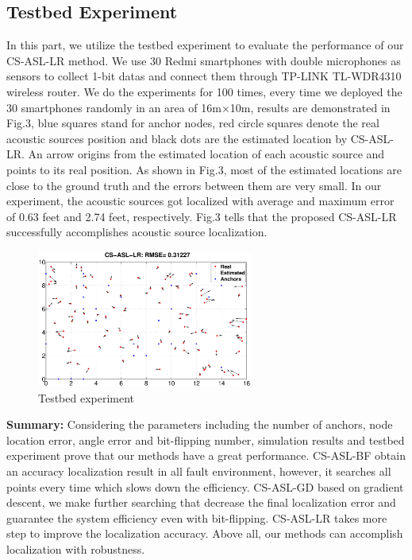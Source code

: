 \subsection{Testbed Experiment}
In this part, we utilize the testbed experiment to evaluate the performance of our CS-ASL-LR method. We use 30 Redmi smartphones with double microphones as sensors to collect 1-bit datas and connect them through TP-LINK TL-WDR4310 wireless router. We do the experiments for 100 times, every time we deployed the 30 smartphones randomly in an area of 16m$\times$10m, results are demonstrated in Fig.3, blue squares stand for anchor nodes, red circle squares denote the real acoustic sources position and black dots are the estimated location by CS-ASL-LR. An arrow origins from the estimated location of each acoustic source and points to its real position. As shown in Fig.3, most of the estimated locations are close to the ground truth and the errors between them are very small. In our experiment, the acoustic sources got localized with average and maximum error of 0.63 feet and 2.74 feet, respectively. Fig.3 tells that the proposed CS-ASL-LR successfully accomplishes acoustic source localization.

\begin{figure}[htb]
	\centering
	\includegraphics[height=4.5cm]{image/lab.eps} 
	\caption{Testbed experiment}
	\label{overview}
\end{figure} 

 \textbf{Summary:} Considering the parameters including the number of anchors, node location error, angle error and bit-flipping number, simulation results and testbed experiment prove that our methods have a great performance. CS-ASL-BF obtain an accuracy localization result in all fault environment, however, it searches all points every time which slows down the efficiency. CS-ASL-GD based on gradient descent, we make further searching that decrease the final localization error and guarantee the system efficiency even with bit-flipping. CS-ASL-LR takes more step to improve the localization accuracy. Above all, our methods can accomplish localization with robustness.

